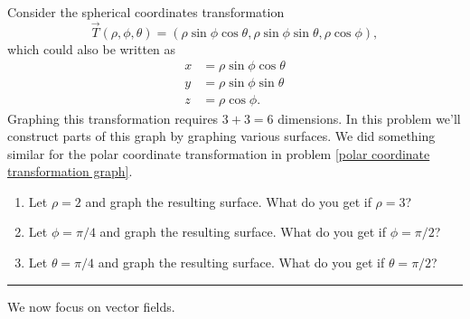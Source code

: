 \begin{problem}%
%
 Consider the spherical coordinates transformation $$\vec T(\rho,\phi,\theta)=(\rho\sin\phi\cos\theta,\rho\sin\phi\sin\theta,\rho\cos\phi),$$ which could also be written as 
\begin{align*}
x&=\rho\sin\phi\cos\theta\\y&=\rho\sin\phi\sin\theta\\z&=\rho\cos\phi. 
\end{align*}
  Graphing this transformation requires $3+3=6$ dimensions. In this problem we'll construct parts of this graph by graphing various surfaces. We did something similar for the polar coordinate transformation in problem \ref{polar coordinate transformation graph}. 
\begin{enumerate}
 \item%
%
Let $\rho=2$ and graph the resulting surface.  What do you get if $\rho = 3$?
 \item %
%
Let $\phi=\pi/4$ and graph the resulting surface.  What do you get if $\phi=\pi/2$?
 \item Let $\theta=\pi/4$ and graph the resulting surface.  What do you get if $\theta=\pi/2$?
\end{enumerate}

\hrule\end{problem}

We now focus on vector fields.

